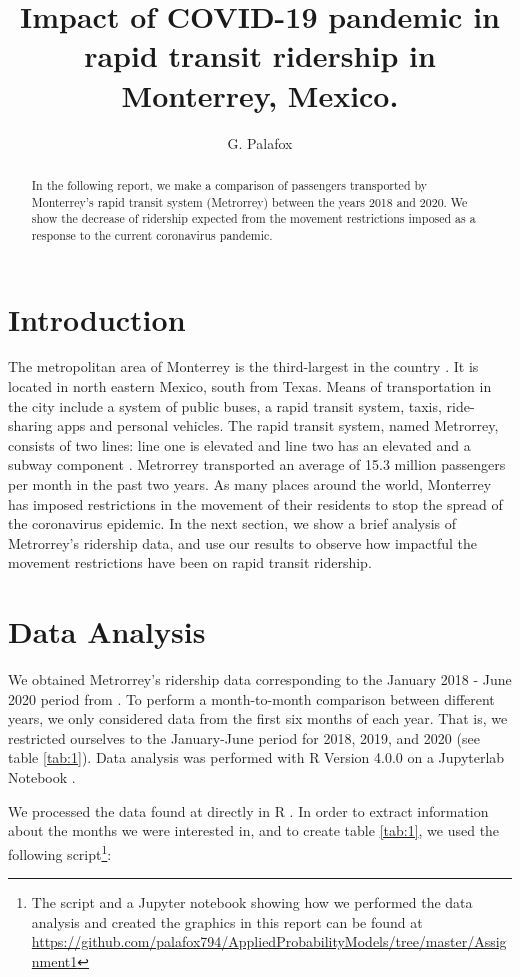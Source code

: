 \documentclass[letterpaper, 10 pt, conference]{article}
\title{Impact of COVID-19 pandemic in rapid transit ridership in Monterrey, Mexico. }
\author{G. Palafox}
\begin{document}
\vspace{-2 cm}

\maketitle

\begin{abstract}
In the following report, we make a comparison of passengers transported by Monterrey's rapid transit system (Metrorrey) between the years 2018 and 2020. We show the decrease of ridership expected from the movement restrictions imposed as a response to the current coronavirus pandemic.
\end{abstract}

\section*{Introduction}
The metropolitan area of Monterrey is the third-largest in the country \cite{zonasmetropolitanas}. It is located in north eastern Mexico, south from Texas. Means of transportation in the city include a system of public buses, a rapid transit system, taxis, ride-sharing apps and personal vehicles. The rapid transit system, named Metrorrey, consists of two lines: line one is elevated and line two has an elevated and a subway component \cite{metro}. Metrorrey transported an average of 15.3 million passengers per month in the past two years. As many places around the world, Monterrey has imposed restrictions in the movement of their residents to stop the spread of the coronavirus epidemic. In the next section, we show a brief  analysis of Metrorrey's ridership data, and use our results to observe how impactful the movement restrictions have been on rapid transit ridership.

\section*{Data Analysis}
We obtained Metrorrey's ridership data corresponding to the January 2018 - June 2020 period from \cite{inegi}. To perform a month-to-month comparison between different years, we only considered data from the first six months of each year. That is, we restricted ourselves to the  January-June period for 2018, 2019, and 2020 (see table \ref{tab:1}). Data analysis was performed with R Version 4.0.0 \cite{R} on a Jupyterlab Notebook \cite{jupyter}. 

We processed the data found at \cite{inegi} directly in R \cite{R}. In order to extract information about the months we were interested in, and to create table \ref{tab:1}, we used the following script\footnote{The script and a Jupyter \cite{jupyter} notebook showing how we performed the data analysis and created the graphics in this report can be found at \url{https://github.com/palafox794/AppliedProbabilityModels/tree/master/Assignment1}}:
\end{document}
